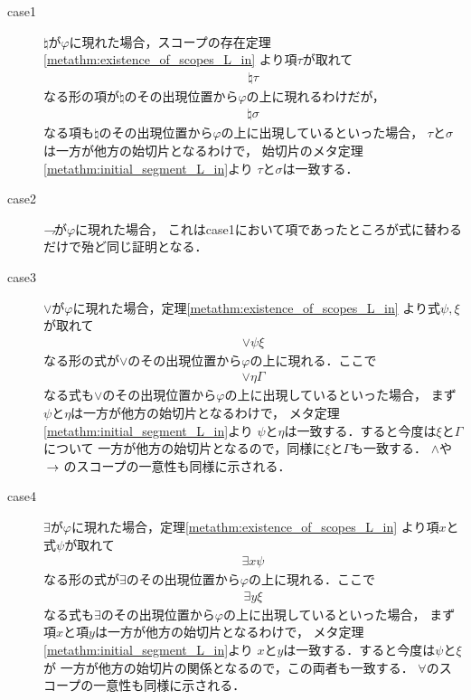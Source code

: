 	\begin{metaprf}\mbox{}
		\begin{description}
			\item[case1]
				$\natural$が$\varphi$に現れた場合，スコープの存在定理\ref{metathm:existence_of_scopes_L_in}
				より項$\tau$が取れて
				\begin{align}
					\natural \tau
				\end{align}
				なる形の項が$\natural$のその出現位置から$\varphi$の上に現れるわけだが，
				\begin{align}
					\natural \sigma
				\end{align}
				なる項も$\natural$のその出現位置から$\varphi$の上に出現しているといった場合，
				$\tau$と$\sigma$は一方が他方の始切片となるわけで，
				始切片のメタ定理\ref{metathm:initial_segment_L_in}より
				$\tau$と$\sigma$は一致する．
			
			\item[case2]
				$\rightharpoondown\hspace{-0.25em}$が$\varphi$に現れた場合，
				これはcase1において項であったところが式に替わるだけで殆ど同じ証明となる．
			
			\item[case3]
				$\vee$が$\varphi$に現れた場合，定理\ref{metathm:existence_of_scopes_L_in}
				より式$\psi,\xi$が取れて
				\begin{align}
					\vee \psi \xi
				\end{align}
				なる形の式が$\vee$のその出現位置から$\varphi$の上に現れる．ここで
				\begin{align}
					\vee \eta \Gamma
				\end{align}
				なる式も$\vee$のその出現位置から$\varphi$の上に出現しているといった場合，
				まず$\psi$と$\eta$は一方が他方の始切片となるわけで，
				メタ定理\ref{metathm:initial_segment_L_in}より
				$\psi$と$\eta$は一致する．すると今度は$\xi$と$\Gamma$について
				一方が他方の始切片となるので，同様に$\xi$と$\Gamma$も一致する．
				$\wedge$や$\hspace{0.25em}\rightarrow\hspace{0.25em}$のスコープの一意性も同様に示される．
				
			\item[case4]
				$\exists$が$\varphi$に現れた場合，定理\ref{metathm:existence_of_scopes_L_in}
				より項$x$と式$\psi$が取れて
				\begin{align}
					\exists x \psi
				\end{align}
				なる形の式が$\exists$のその出現位置から$\varphi$の上に現れる．ここで
				\begin{align}
					\exists y \xi
				\end{align}
				なる式も$\exists$のその出現位置から$\varphi$の上に出現しているといった場合，
				まず項$x$と項$y$は一方が他方の始切片となるわけで，
				メタ定理\ref{metathm:initial_segment_L_in}より
				$x$と$y$は一致する．すると今度は$\psi$と$\xi$が
				一方が他方の始切片の関係となるので，この両者も一致する．
				$\forall$のスコープの一意性も同様に示される．
				\QED
		\end{description}
	\end{metaprf}
